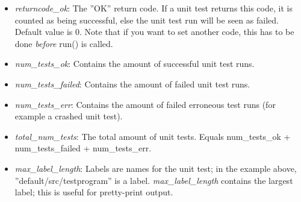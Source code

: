 \documentclass[a4,10pt]{article}
\begin{document}
\begin{itemize}
	\item \emph{returncode\_ok}: The ''OK'' return code. If a unit test returns this code, it is counted as being successful, else the unit test run will be seen as failed. Default value is 0. Note that if you want to set another code, this has to be done \emph{before} run() is called.
	\item \emph{num\_tests\_ok}: Contains the amount of successful unit test runs.
	\item \emph{num\_tests\_failed}:  Contains the amount of failed unit test runs.
	\item \emph{num\_tests\_err}: Contains the amount of failed erroneous test runs (for example a crashed unit test).
	\item \emph{total\_num\_tests}: The total amount of unit tests. Equals num\_tests\_ok + num\_tests\_failed + num\_tests\_err.
	\item \emph{max\_label\_length}: Labels are names for the unit test; in the example above, ''default/src/testprogram'' is a label. \emph{max\_label\_length} contains the largest label; this is useful for pretty-print output.
\end{itemize}
\end{document}
